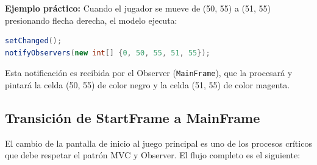 \documentclass[12pt, a4paper]{article}
\begin{document}
\textbf{Ejemplo práctico:} Cuando el jugador se mueve de (50, 55) a (51, 55) presionando flecha derecha, el modelo ejecuta:

\begin{lstlisting}[language=Java]
setChanged();
notifyObservers(new int[] {0, 50, 55, 51, 55});
\end{lstlisting}

Esta notificación es recibida por el Observer (\texttt{MainFrame}), que la procesará y pintará la celda (50, 55) de color negro y la celda (51, 55) de color magenta.

\subsection{Transición de StartFrame a MainFrame}

El cambio de la pantalla de inicio al juego principal es uno de los procesos críticos que debe respetar el patrón MVC y Observer. El flujo completo es el siguiente:
\end{document}
